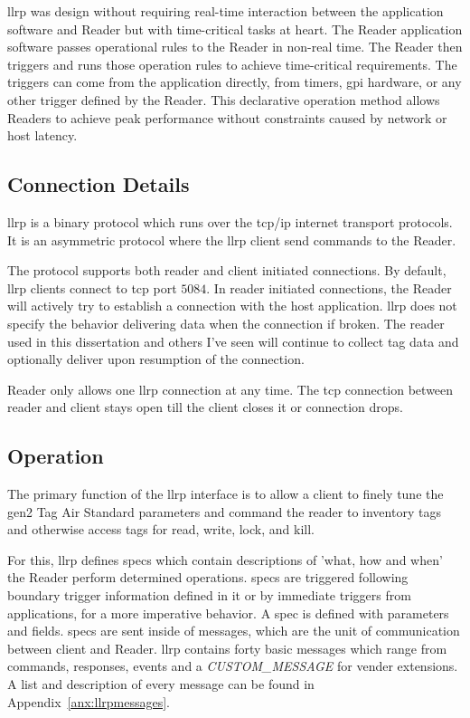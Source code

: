\ac{llrp} was design without requiring real-time interaction between the application software and Reader but with time-critical tasks at heart. 
The Reader application software passes operational rules to the Reader in non-real time.
The Reader then triggers and runs those operation rules to achieve time-critical requirements. 
The triggers can come from the application directly, from timers, \ac{gpi} hardware, or any other trigger defined by the Reader. 
This declarative operation method allows Readers to achieve peak performance without constraints caused by network or host latency.

\subsection{Connection Details}

\ac{llrp} is a binary protocol which runs over the \acs{tcp}/\acs{ip} internet transport protocols.
It is an asymmetric protocol where the \ac{llrp} client send commands to the Reader.

The protocol supports both reader and client initiated connections. By default, \ac{llrp} clients connect to \ac{tcp} port $5084$. In reader initiated connections, the Reader will actively try to establish a connection with the host application.
\ac{llrp} does not specify the behavior delivering data when the connection if broken. The reader used in this dissertation and others I've seen will continue to collect tag data and optionally deliver upon resumption of the connection.

Reader only allows one \ac{llrp} connection at any time. The \ac{tcp} connection between reader and client stays open till the client closes it or connection drops.

\subsection{Operation}

The primary function of the \ac{llrp} interface is to allow a client to finely tune the \ac{gen2} Tag Air Standard parameters and command the reader to inventory tags and otherwise access tags for read, write, lock, and kill.

For this, \ac{llrp} defines \acp{spec} which contain descriptions of 'what, how and when' the Reader perform determined operations.
\acp{spec} are triggered following boundary trigger information defined in it or by immediate triggers from applications, for a more imperative behavior.
A \ac{spec} is defined with parameters and fields. \acp{spec} are sent inside of messages, which are the unit of communication between client and Reader.
\ac{llrp} contains forty basic messages which range from commands, responses, events and a \textit{CUSTOM\_MESSAGE} for vender extensions. A list and description of every message can be found in Appendix~\ref{anx:llrpmessages}.

